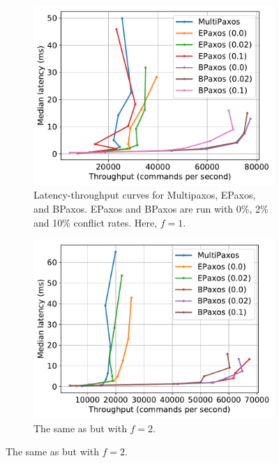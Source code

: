 \begin{figure}[ht]
  \centering
  \begin{subfigure}[c]{0.36\textwidth}
    \centering
    \includegraphics[width=\textwidth]{assets/nsdi_fig1_lt_f1.pdf}
    \caption{
      Latency-throughput curves for Multipaxos, EPaxos, and BPaxos. EPaxos and
      BPaxos are run with 0\%, 2\% and 10\% conflict rates. Here, $f = 1$.
    }
  \end{subfigure}
  \begin{subfigure}[c]{0.36\textwidth}
    \centering
    \includegraphics[width=\textwidth]{assets/nsdi_fig1_lt_f2.pdf}
    \caption{The same as  but with $f=2$.}%
  \end{subfigure}

\end{figure}
